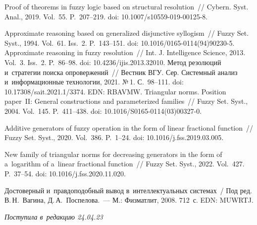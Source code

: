 \begin{multicols}{2}
{{\begin{thebibliography}{99}
 Proof of theorems in fuzzy logic based on structural resolution~// Cybern. 
Syst. Anal., 2019. Vol.~55. P.~207--219. doi: 10.1007/s10559-019-00125-8.

 Approximate reasoning based on generalized disjunctive syllogism~// 
Fuzzy Set. Syst., 1994. Vol.~61. Iss.~2. P.~143--151. doi:  
10.1016/0165-0114(94)90230-5.
 Approximate reasoning in fuzzy resolution~// Int. J. Intelligence Science, 
2013. Vol.~3. Iss.~2. P.~86--98. doi: 10.4236/ijis.2013.32010.
 Метод резолюций и~стратегии поиска 
опровержений~// Вестник ВГУ. Сер. Системный анализ и~информационные технологии, 
2021. №\,1. С.~98--111. doi: 10.17308/sait.2021.1/3374. EDN: RBAVMW.
 Triangular norms. Position paper~II: General constructions and 
parameterized families~// Fuzzy Set. Syst., 2004. Vol.~145. P.~411--438. doi:  
10.1016/S0165-0114(03)00327-0.


 Additive generators of fuzzy operation in the form of linear fractional function~// 
Fuzzy Set. Syst., 2020. Vol.~386. P.~1--24. doi: 10.1016/j.fss.2019.03.005.

 New family of triangular norms for decreasing generators in the form of 
a~logarithm of a~linear fractional function~// Fuzzy Set. Syst., 2022. Vol.~427. P.~37--54. doi: 
10.1016/j.fss.2020.11.020.

 Достоверный 
и~правдоподобный вывод в~интеллектуальных системах~/ Под ред. В.\,Н.~Вагина, 
Д.\,А.~Поспелова.~--- М.: Физматлит, 2008. 712~с. EDN: MUWRTJ.
\end{thebibliography}

 }
 }

\end{multicols}

\vspace*{-6pt}

\hfill{\small\textit{Поступила в~редакцию 24.04.23}}

\vspace*{8pt}




